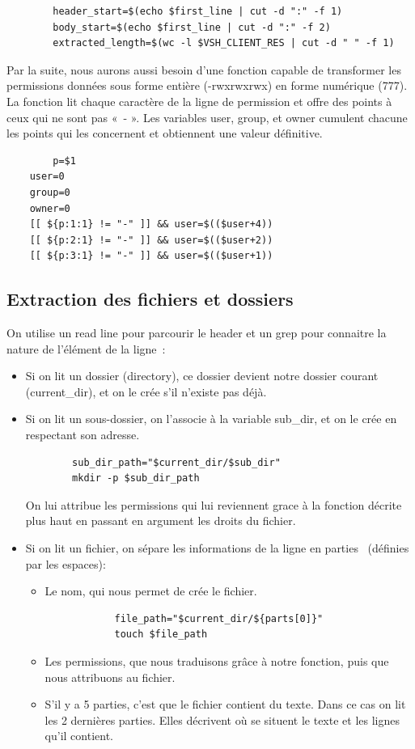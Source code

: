 \documentclass[titlepage]{article}
\begin{document}
	\begin{lstlisting}
		header_start=$(echo $first_line | cut -d ":" -f 1)
		body_start=$(echo $first_line | cut -d ":" -f 2) 
		extracted_length=$(wc -l $VSH_CLIENT_RES | cut -d " " -f 1)
	\end{lstlisting}

	Par la suite, nous aurons aussi besoin d’une fonction capable de transformer les permissions données sous forme entière (-rwxrwxrwx) en forme numérique (777). La fonction lit chaque caractère de la ligne de permission et offre des points à ceux qui ne sont pas « - ». Les variables user, group, et owner cumulent chacune les points qui les concernent et obtiennent une valeur définitive.

	\begin{lstlisting}
		p=$1
	user=0
	group=0
	owner=0
	[[ ${p:1:1} != "-" ]] && user=$(($user+4))
	[[ ${p:2:1} != "-" ]] && user=$(($user+2))
	[[ ${p:3:1} != "-" ]] && user=$(($user+1))
	\end{lstlisting}

	\subsection{Extraction des fichiers et dossiers}

	On utilise un read line pour parcourir le header et un grep pour connaitre la nature de l’élément de la ligne :
	\begin{itemize}
		\item Si on lit un dossier (directory), ce dossier devient notre dossier courant (current_dir), et on le crée s’il n’existe pas déjà.
		\item Si on lit un sous-dossier, on l’associe à la variable sub_dir, et on le crée en respectant son adresse. 
		\begin{lstlisting}
		sub_dir_path="$current_dir/$sub_dir"
		mkdir -p $sub_dir_path	
		\end{lstlisting}
		On lui attribue les permissions qui lui reviennent grace à la fonction décrite plus haut en passant en argument les droits du fichier.
		\item Si on lit un fichier, on sépare les informations de la ligne en parties  (définies par les espaces):
		\begin{itemize}
			\item Le nom, qui nous permet de crée le fichier.
			\begin{lstlisting}
			file_path="$current_dir/${parts[0]}"
			touch $file_path
			\end{lstlisting}			
			\item Les permissions, que nous traduisons grâce à notre fonction, puis que nous attribuons au fichier.
			\item S’il y a 5 parties, c’est que le fichier contient du texte. Dans ce cas on lit les 2 dernières parties. Elles décrivent où se situent le texte et les lignes qu’il contient.
		\end{itemize}
	\end{itemize}
\end{document}
